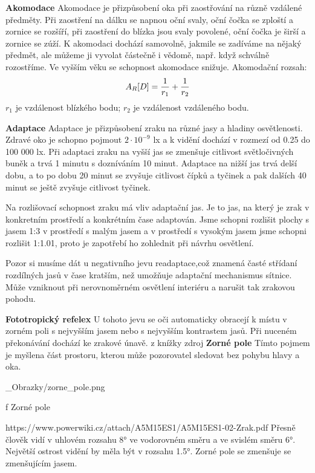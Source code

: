 {\bf Akomodace}
\medskip
Akomodace je přizpůsobení oka při zaostřování na různě vzdálené předměty.
Při zaostření na dálku se napnou oční svaly, oční čočka se zploští a zornice se rozšíří, při zaostření do blízka jsou svaly povolené, oční čočka je širší a zornice se zúží.
K akomodaci dochází samovolně, jakmile se zadíváme na nějaký předmět, ale můžeme ji vyvolat částečně i vědomě, např. když schválně rozostříme. Ve vyšším věku se schopnost akomodace snižuje.
\medskip
Akomodační rozsah:
$$A_R [D] = {1\over r_1}+{1\over r_2}$$
\medskip
$r_1$ je vzdálenost blízkého bodu;
\medskip
$r_2$ je vzdálenost vzdáleného bodu.
\medskip

{\bf Adaptace}
\medskip
Adaptace je přizpůsobení zraku na různé jasy a hladiny osvětlenosti. Zdravé oko je schopno pojmout $2\cdot10^{-9}$ lx a k vidění dochází v rozmezí od 0.25 do 100 000 lx.
\medskip
Při adaptaci zraku na vyšší jas se zmenšuje citlivost světločivných buněk a trvá 1 minutu s dozníváním 10 minut. Adaptace na nižší jas trvá delší dobu, a to po dobu 20 minut se zvyšuje citlivost čípků a tyčinek a pak dalších 40 minut se ještě zvyšuje citlivost tyčinek.

Na rozlišovací schopnost zraku má vliv adaptační jas. Je to jas, na který je zrak v konkretním prostředí a konkrétním čase adaptován. Jsme schopni rozlišit plochy s jasem 1:3 v prostředí s malým jasem a v prostředí s vysokým jasem jsme schopni rozlišit 1:1.01, proto je zapotřebí ho zohlednit při návrhu osvětlení.

Pozor si musíme dát u negativního jevu readaptace,což znamená časté střídaní rozdílných jasů v čase kratším, než umožňuje adaptační mechanismus sítnice. Může vzniknout při nerovnoměrném osvětlení interiéru a narušit tak zrakovou pohodu.

\medskip

{\bf Fototropický refelex}
\medskip
U tohoto jevu se oči automaticky obracejí k místu v zorném poli s nejvyšším jasem nebo s nejvyšším kontrastem jasů. Při nuceném překonávání dochází ke zrakové únavě.
z knížky zdroj
\medskip
{\bf Zorné pole}
\medskip
Tímto pojmem je myšlena část prostoru, kterou může pozorovatel sledovat bez pohybu hlavy a oka.

\medskip {}
\picw=12cm _Obrazky/zorne_pole.png
\caption/f Zorné pole

\medskip
https://www.powerwiki.cz/attach/A5M15ES1/A5M15ES1-02-Zrak.pdf
\medskip
Přesně člověk vidí v uhlovém rozsahu 8° ve vodorovném směru a ve svislém směru 6°. Největší ostrost vidění by měla být v rozsahu 1.5°. Zorné pole se zmenšuje se zmenšujícím jasem. 


